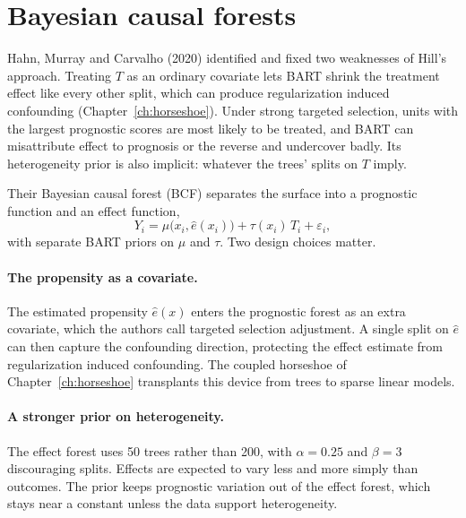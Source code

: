 \section{Bayesian causal forests}

Hahn, Murray and Carvalho (2020) identified and fixed two weaknesses of Hill's approach. Treating $T$ as an ordinary covariate lets BART shrink the treatment effect like every other split, which can produce regularization induced confounding (Chapter~\ref{ch:horseshoe}). Under strong targeted selection, units with the largest prognostic scores are most likely to be treated, and BART can misattribute effect to prognosis or the reverse and undercover badly. Its heterogeneity prior is also implicit: whatever the trees' splits on $T$ imply.

Their Bayesian causal forest (BCF) separates the surface into a prognostic function and an effect function,
\begin{equation}
Y_i = \mu\bigl(x_i, \hat e(x_i)\bigr) + \tau(x_i)\,T_i + \varepsilon_i,
\label{eq:bcf}
\end{equation}
with separate BART priors on $\mu$ and $\tau$. Two design choices matter.

\paragraph{The propensity as a covariate.} The estimated propensity $\hat e(x)$ enters the prognostic forest as an extra covariate, which the authors call targeted selection adjustment. A single split on $\hat e$ can then capture the confounding direction, protecting the effect estimate from regularization induced confounding. The coupled horseshoe of Chapter~\ref{ch:horseshoe} transplants this device from trees to sparse linear models.

\paragraph{A stronger prior on heterogeneity.} The effect forest uses 50 trees rather than 200, with $\alpha = 0.25$ and $\beta = 3$ discouraging splits. Effects are expected to vary less and more simply than outcomes. The prior keeps prognostic variation out of the effect forest, which stays near a constant unless the data support heterogeneity.

